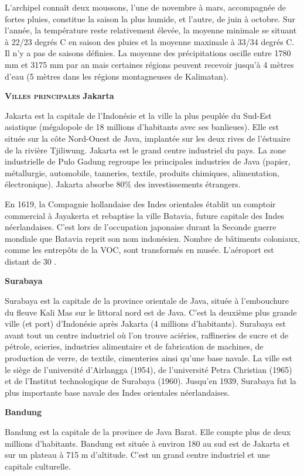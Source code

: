 \begin{multicols}{2}
L'archipel connaît deux moussons, l'une de novembre à mars, accompagnée de fortes pluies, constitue la saison la plus humide, et l'autre, de juin à octobre. Sur l'année, la température reste relativement élevée, la moyenne minimale se situant à 22/23 degrés C en saison des pluies et la moyenne maximale à 33/34 degrés C. Il n'y a pas de saisons définies. La moyenne des précipitations oscille entre 1780 mm et 3175 mm par an mais certaines régions peuvent recevoir jusqu'à 4 mètres d'eau (5 mètres dans les régions montagneuses de Kalimatan).

\textbf{\textsc{Villes principales}}
\textbf{Jakarta}

Jakarta est la capitale de l'Indonésie et la ville la plus peuplée du Sud-Est asiatique (mégalopole de 18 millions d'habitants avec ses banlieues). Elle est située sur la côte Nord-Ouest de Java, implantée sur les deux rives de l'éstuaire de la rivière Tjiliwung. Jakarta est le grand centre industriel du pays. La zone industrielle de Pulo Gadung regroupe les principales industries de Java (papier, métallurgie, automobile, tanneries, textile, produits chimiques, alimentation, électronique). Jakarta absorbe 80\% des investissements étrangers.

En 1619, la Compagnie hollandaise des Indes orientales établit un comptoir commercial à Jayakerta et rebaptise la ville Batavia, future capitale des Indes néerlandaises. C'est lors de l'occupation japonaise durant la Seconde guerre mondiale que Batavia reprit son nom indonésien. Nombre de bâtiments coloniaux, comme les entrepôts de la VOC, sont transformés en musée. L'aéroport est distant de 30 \kilo\meter.

\textbf{Surabaya}

Surabaya est la capitale de la province orientale de Java, située à l'embouchure du fleuve Kali Mas sur le littoral nord est de Java. C'est la deuxième plus grande ville (et port) d'Indonésie après Jakarta (4 millions d'habitants). Surabaya est avant tout un centre industriel où l'on trouve aciéries, raffineries de sucre et de pétrole, scieries, industries alimentaire et de fabrication de machines, de production de verre, de textile, cimenteries ainsi qu'une base navale. La ville est le siège de l'université d'Airlangga (1954), de l'université Petra Christian (1965) et de l'Institut technologique de Surabaya (1960). Jusqu'en 1939, Surabaya fut la plus importante base navale des Indes orientales néerlandaises.

\textbf{Bandung}

Bandung est la capitale de la province de Java Barat. Elle compte plus de deux millions d'habitants. Bandung est située à environ 180 \kilo\meter au sud est de Jakarta et sur un plateau à 715 m d'altitude. C'est un grand centre industriel et une capitale culturelle.


\end{multicols}
